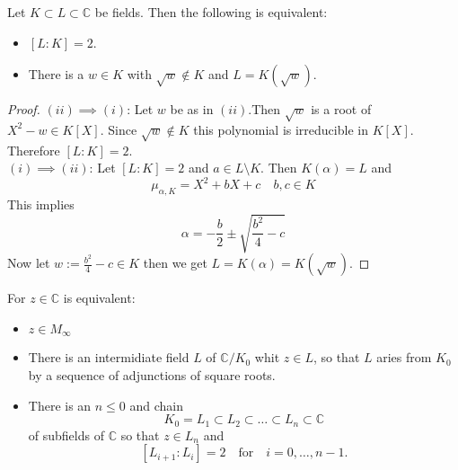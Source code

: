 \begin{lemma}
    \label{lem:dergee2_iff_adjoint_sqrt}
    Let $K\subset L \subset \mathbb{C}$ be fields. Then the following is equivalent:
    \begin{itemize}
        \item $[L:K] = 2$.
        \item There is a $w \in K$ with $\sqrt{w} \notin K$ and $L = K(\sqrt{w})$.
    \end{itemize}
\end{lemma}
\begin{proof}
    $(ii)\implies (i)$: Let $w$ be as in $(ii)$.Then $\sqrt{w}$ is a root of $X^2 - w \in K[X]$. Since $\sqrt{w} \notin K$ this polynomial is irreducible in $K[X]$. Therefore $[L:K] = 2$.\\
    $(i)\implies (ii)$: Let $[L:K] = 2$ and $a \in L \setminus K$. Then $K(\alpha) = L$ and 
    $$\mu_{\alpha, K}=X^2 + bX + c \quad b,c \in K$$
    This implies 
    $$\alpha = -\frac{b}{2} \pm \sqrt{\frac{b^2}{4} - c} $$
    Now let $w := \frac{b^2}{4} - c \in K$ then we get $L = K(\alpha) = K(\sqrt{w})$.
\end{proof}



\begin{theorem}
    \label{thm:Z_in_Minf_1}
    For $z \in \mathbb{C}$ is equivalent:
    \begin{itemize}
        \item $z \in M_{\infty}$
        \item There is an intermidiate field $L$ of $\mathbb{C}/K_0$ whit $z \in L$, so that $L$ aries from $K_0$ by a sequence of adjunctions of square roots.
        \item There is an $n\le 0$ and chain 
            $$K_0 = L_1 \subset L_2 \subset \ldots \subset L_n \subset \mathbb{C}$$
            of subfields of $\mathbb{C}$ so that $z \in L_n$ and 
            $$ [L_{i+1}:L_i] = 2 \quad \text{for} \quad i = 0, \ldots, n-1.$$
    \end{itemize}
\end{theorem}


